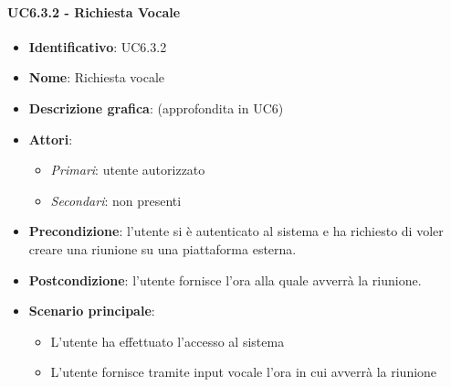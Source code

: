 \paragraph{UC6.3.2 - Richiesta Vocale}
\begin{itemize}
   \item \textbf{Identificativo}: UC6.3.2
   \item \textbf{Nome}: Richiesta vocale
   \item \textbf{Descrizione grafica}: (approfondita in UC6)
   \item \textbf{Attori}:
   \begin{itemize} 
       \item \textit{Primari}: utente autorizzato
       \item \textit{Secondari}: non presenti
   \end{itemize}
       \item \textbf{Precondizione}: l'utente si è autenticato al sistema e ha richiesto di voler creare una riunione su una piattaforma esterna.
       \item \textbf{Postcondizione}: l'utente fornisce l'ora alla quale avverrà la riunione.
    \item \textbf{Scenario principale}: 
       \begin{itemize}
           \item L'utente ha effettuato l'accesso al sistema 
           \item L'utente fornisce tramite input vocale l'ora in cui avverrà la riunione
       \end{itemize}
\end{itemize}


